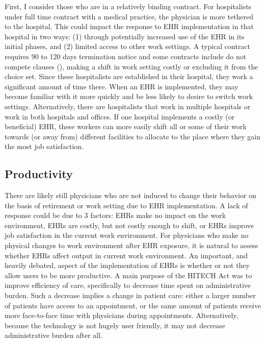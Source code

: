 \documentclass[11pt]{article}
\begin{document}
First, I consider those who are in a relatively binding contract. For hospitalists under full time contract with a medical practice, the physician is more tethered to the hospital. This could impact the response to EHR implementation in that hospital in two ways: (1) through potentially increased use of the EHR in its initial phases, and (2) limited access to other work settings. A typical contract requires 90 to 120 days termination notice and some contracts include do not compete clauses (\cite{yasgur_by_-_yasgur_2016}), making a shift in work setting costly or excluding it from the choice set. Since these hospitalists are established in their hospital, they work a significant amount of time there. When an EHR is implemented, they may become familiar with it more quickly and be less likely to desire to switch work settings. Alternatively, there are hospitalists that work in multiple hospitals or work in both hospitals and offices. If one hospital implements a costly (or beneficial) EHR, these workers can more easily shift all or some of their work towards (or away from) different facilities to allocate to the place where they gain the most job satisfaction.  


\subsection{Productivity}

There are likely still physicians who are not induced to change their behavior on the basis of retirement or work setting due to EHR implementation. A lack of response could be due to 3 factors: EHRs make no impact on the work environment, EHRs are costly, but not costly enough to shift, or EHRs improve job satisfaction in the current work environment. For physicians who make no physical changes to work environment after EHR exposure, it is natural to assess whether EHRs affect output in current work environment. An important, and heavily debated, aspect of the implementation of EHRs is whether or not they allow users to be more productive. A main purpose of the HITECH Act was to improve efficiency of care, specifically to decrease time spent on administrative burden. Such a decrease implies a change in patient care: either a larger number of patients have access to an appointment, or the same amount of patients receive more face-to-face time with physicians during appointments. Alternatively, because the technology is not hugely user friendly, it may not decrease administrative burden after all.
\end{document}

